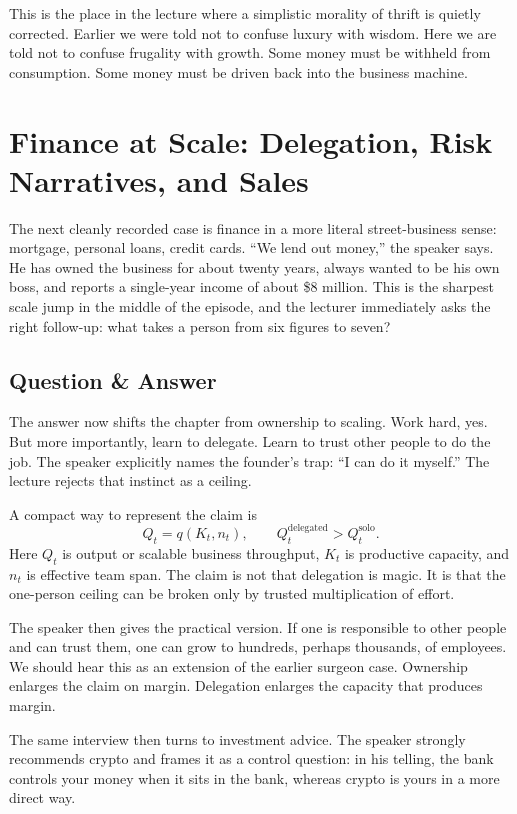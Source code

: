 This is the place in the lecture where a simplistic morality of thrift is quietly corrected. Earlier we were told not to confuse luxury with wisdom. Here we are told not to confuse frugality with growth. Some money must be withheld from consumption. Some money must be driven back into the business machine.

\section{Finance at Scale: Delegation, Risk Narratives, and Sales}

The next cleanly recorded case is finance in a more literal street-business sense: mortgage, personal loans, credit cards. ``We lend out money,'' the speaker says. He has owned the business for about twenty years, always wanted to be his own boss, and reports a single-year income of about \$8 million. This is the sharpest scale jump in the middle of the episode, and the lecturer immediately asks the right follow-up: what takes a person from six figures to seven?

\subsection{Question \& Answer}

The answer now shifts the chapter from ownership to scaling. Work hard, yes. But more importantly, learn to delegate. Learn to trust other people to do the job. The speaker explicitly names the founder's trap: ``I can do it myself.'' The lecture rejects that instinct as a ceiling.

A compact way to represent the claim is
\begin{equation}
Q_t = q(K_t,n_t), \qquad Q_t^{\text{delegated}} > Q_t^{\text{solo}}.
\end{equation}
Here \(Q_t\) is output or scalable business throughput, \(K_t\) is productive capacity, and \(n_t\) is effective team span. The claim is not that delegation is magic. It is that the one-person ceiling can be broken only by trusted multiplication of effort.

The speaker then gives the practical version. If one is responsible to other people and can trust them, one can grow to hundreds, perhaps thousands, of employees. We should hear this as an extension of the earlier surgeon case. Ownership enlarges the claim on margin. Delegation enlarges the capacity that produces margin.

The same interview then turns to investment advice. The speaker strongly recommends crypto and frames it as a control question: in his telling, the bank controls your money when it sits in the bank, whereas crypto is yours in a more direct way.


